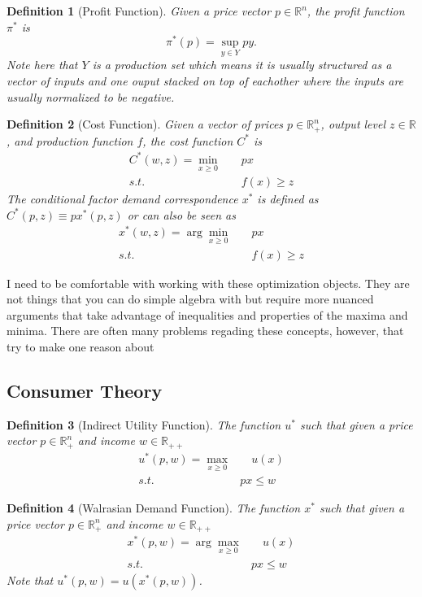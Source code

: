 \documentclass[11pt,english]{article}
\newtheorem{definition}{Definition}[section]
\begin{document}
\begin{definition}[Profit Function]
Given a price vector $p\in \mathbb{R}^n$, the profit function $\pi^*$ is $$\pi^*(p) = \sup_{y\in Y} py.$$ Note here that $Y$ is a production set which means it is usually structured as a vector of inputs and one ouput stacked on top of eachother where the inputs are usually normalized to be negative.
\end{definition}

\begin{definition}[Cost Function]
Given a vector of prices $p\in \mathbb{R}^n_+$, output level $z\in \mathbb{R}$, and production function $f$, the cost function $C^*$ is \begin{align*}
C^*(w,z) = \min_{x \geq 0}&\quad px\\
s.t.&\quad f(x) \geq z
\end{align*}
The conditional factor demand correspondence $x^*$ is defined as $C^*(p,z) \equiv p x^*(p,z)$ or can also be seen as \begin{align*}
x^*(w,z) = \arg\min_{x \geq 0}&\quad px\\
s.t.&\quad f(x) \geq z
\end{align*}
\end{definition}

I need to be comfortable with working with these optimization objects. They are not things that you can do simple algebra with but require more nuanced arguments that take advantage of inequalities and properties of the maxima and minima. There are often many problems regading these concepts, however, that try to make one reason about 

\subsection{Consumer Theory}

\begin{definition}[Indirect Utility Function]
The function $u^*$ such that given a price vector $p \in \mathbb{R}_+^n$ and income $w \in \mathbb{R}_{++}$ \begin{align*}
u^*(p,w) = \max_{x \geq 0} & \quad u(x)\\
s.t. \quad & px \leq w
\end{align*}
\end{definition}

\begin{definition}[Walrasian Demand Function]
The function $x^*$ such that given a price vector $p \in \mathbb{R}_+^n$ and income $w \in \mathbb{R}_{++}$ \begin{align*}
x^*(p,w) = \arg\max_{x \geq 0} & \quad u(x)\\
s.t. \quad & px \leq w
\end{align*} Note that $u^*(p,w) = u(x^*(p,w))$.
\end{definition}
\end{document}
